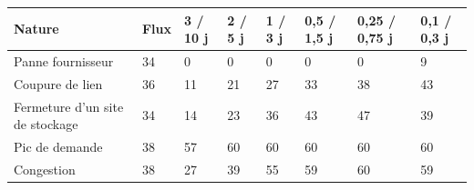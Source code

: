 \begin{center}\begin{minipage}{\textwidth}
\label{tab:S4}
\footnotesize
\begin{tabularx}{\textwidth}{@{}LLLLLLLL@{}}
\toprule
\textbf{Nature} & \textbf{Flux} & \textbf{3 / 10 j} & \textbf{2 / 5 j} & \textbf{1 / 3 j} & \textbf{0,5 / 1,5 j} & \textbf{0,25 / 0,75 j} & \textbf{0,1 / 0,3 j} \\
\midrule
Panne fournisseur & 34 & 0 & 0 & 0 & 0 & 0 & 9 \\
Coupure de lien & 36 & 11 & 21 & 27 & 33 & 38 & 43 \\
Fermeture d'un site de stockage & 34 & 14 & 23 & 36 & 43 & 47 & 39 \\
Pic de demande & 38 & 57 & 60 & 60 & 60 & 60 & 60 \\
Congestion & 38 & 27 & 39 & 55 & 59 & 60 & 59 \\
\bottomrule
\end{tabularx}
\end{minipage}\end{center}
